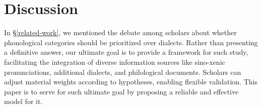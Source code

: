 \section{Discussion} \label{discussion}
In \S\ref{related-work}, we mentioned the debate among scholars about whether phonological categories should be prioritized over dialects.
Rather than presenting a definitive answer, our ultimate goal is to provide a framework for such study, facilitating the integration of diverse information sources like sino-xenic pronunciations, additional dialects, and philological documents. Scholars can adjust material weights according to hypotheses, enabling flexible validation. 
This paper is to serve for such ultimate goal by proposing a reliable and effective model for it.

